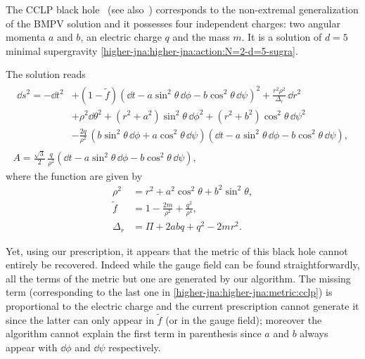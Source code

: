 The CCLP black hole~\cite{Chong:2005:GeneralNonExtremalRotating} (see also~\cite[sec.~2]{Aliev:2014:SuperradianceBlackHole}) corresponds to the non-extremal generalization of the BMPV solution and it possesses four independent charges: two angular momenta $a$ and $b$, an electric charge $q$ and the mass $m$.
It is a solution of $d = 5$ minimal supergravity \eqref{higher-jna:higher-jna:action:N=2-d=5-sugra}.

The solution reads
\begin{subequations}
\begin{gather}
	\label{higher-jna:higher-jna:metric:cclp}
	\begin{aligned}
		\dd s^2 = - \dd t^2
			&+ (1 - \tilde f) (\dd t - a \sin^2 \theta\, \dd \phi - b \cos^2 \theta\, \dd \psi)^2
			+ \frac{r^2 \rho^2}{\Delta_r}\, \dd r^2 \\
			&+ \rho^2 \dd\theta^2
			+ (r^2 + a^2) \sin^2 \theta\, \dd\phi^2
			+ (r^2 + b^2) \cos^2 \theta\, \dd \psi^2 \\
			&- \frac{2 q}{\rho^2}\, (b \sin^2 \theta\, \dd \phi + a \cos^2 \theta\, \dd \psi) (\dd t - a \sin^2 \theta\, \dd \phi - b \cos^2 \theta\, \dd \psi),
	\end{aligned} \\
	A = \frac{\sqrt{3}}{2}\, \frac{q}{\rho^2} (\dd t - a \sin^2 \theta\, \dd \phi - b \cos^2 \theta\, \dd \psi),
\end{gather}
\end{subequations}
where the function are given by
\begin{subequations}
\begin{align}
	\rho^2 &= r^2 + a^2 \cos^2 \theta + b^2 \sin^2 \theta, \\
	\tilde f &= 1 - \frac{2 m}{\rho^2} + \frac{q^2}{\rho^4}, \\
	\Delta_r &= \Pi + 2 a b q + q^2 - 2 m r^2.
\end{align}
\end{subequations}

Yet, using our prescription, it appears that the metric of this black hole cannot entirely be recovered.
Indeed while the gauge field can be found straightforwardly, all the terms of the metric but one are generated by our algorithm.
The missing term (corresponding to the last one in \eqref{higher-jna:higher-jna:metric:cclp}) is proportional to the electric charge and the current prescription cannot generate it since the latter can only appear in $\tilde f$ (or in the gauge field); moreover the algorithm cannot explain the first term in parenthesis since $a$ and $b$ always appear with $\dd\phi$ and $\dd\psi$ respectively.

